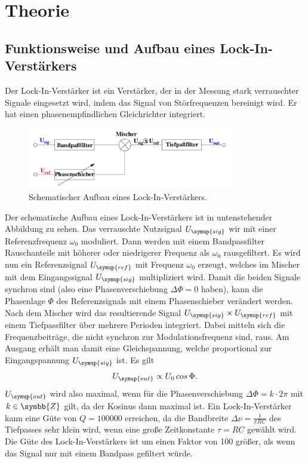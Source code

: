 \section{Theorie}
\label{sec:Theorie}
 \subsection{Funktionsweise und Aufbau eines Lock-In-Verstärkers}
  Der Lock-In-Verstärker ist ein Verstärker, der in der Messung stark verrauschter
  Signale eingesetzt wird, indem das Signal von Störfrequenzen bereinigt wird.
  Er hat einen phasenempfindlichen Gleichrichter integriert.
  \begin{figure}
    \centering
    \includegraphics[width=0.8\textwidth]{aufbau.png}
    \caption{Schematischer Aufbau eines Lock-In-Verstärkers\cite{sample}.}
    \label{fig:aufbau}
  \end{figure}
  Der schematische Aufbau eines Lock-In-Verstärkers ist in untenstehender Abbildung
  zu sehen.
  Das verrauschte Nutzsignal $U_\symup{sig}$ wir mit einer Referenzfrequenz $\omega_0$
  moduliert. Dann werden mit einem Bandpassfilter Rauschanteile mit höherer oder
  niedrigerer Frequenz als $\omega_0$ rausgefiltert.
  Es wird nun ein Referenzsignal $U_\symup{ref}$ mit Frequenz $\omega_0$ erzeugt,
  welches im Mischer mit dem Eingangssignal $U_\symup{sig}$ multipliziert wird.
  Damit die beiden Signale synchron sind (also eine Phasenverschiebung
  $\Delta\Phi=0$ haben), kann die Phasenlage $\Phi$ des Referenzsignals mit einem
  Phasenschieber verändert werden.
  Nach dem Mischer wird das resultierende Signal $U_\symup{sig} \times U_\symup{ref}$
  mit einem Tiefpassfilter über mehrere Perioden integriert. Dabei mitteln sich
  die Frequenzbeiträge, die nicht synchron zur Modulationsfrequenz sind, raus.
  Am Ausgang erhält man damit eine Gleichspannung, welche proportional zur
  Eingangspannung $U_\symup{sig}$ ist. Es gilt
  \begin{equation}
    U_\symup{out}\propto U_0\, cos\,\Phi.
    \label{eqn:porportionalitaet}
  \end{equation}
  $U_\symup{out}$ wird also maximal, wenn für die Phasenverschiebung
  $\Delta\Phi=k\cdot2\pi$ mit $k\in\symbb{Z}$ gilt, da der Kosinus dann maximal ist.
  Ein Lock-In-Verstärker kann eine Güte von $Q=100000$ erreichen, da die Bandbreite
  $\Delta\nu = \frac{1}{\pi RC}$ des Tiefpasses sehr klein wird, wenn eine große
  Zeitkonstante $\tau=RC$ gewählt wird.
  Die Güte des Lock-In-Verstärkers ist um einen Faktor von 100 größer, als wenn
  das Signal nur mit einem Bandpass gefiltert würde.
  \newpage
